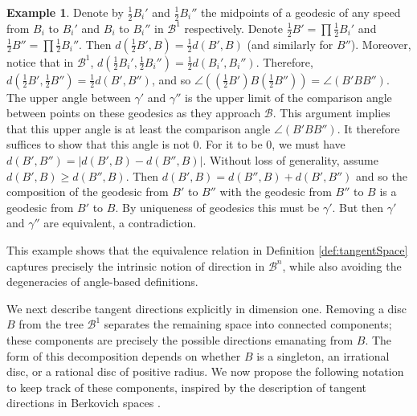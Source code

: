 \documentclass[10pt]{article}
\theoremstyle{definition}
\newtheorem{example}[theorem]{Example}
\begin{document}
\begin{example}
    Denote by $\frac{1}{2}B_i'$ and $\frac{1}{2}B_i''$ the midpoints of a geodesic of any speed from $B_i$ to $B_i'$ and $B_i$ to $B_i''$ in $\mathcal B^1$ respectively. Denote $\frac{1}{2}B' = \prod \frac{1}{2}B_i'$ and $\frac{1}{2}B'' = \prod \frac{1}{2}B_i''$. Then $d(\frac{1}{2}B',B) = \frac{1}{2}d(B',B)$ (and similarly for $B''$). Moreover, notice that in $\mathcal B^1$, $d(\frac{1}{2}B_i',\frac{1}{2}B_i'') = \frac{1}{2}d(B_i',B_i'')$. Therefore, $d(\frac{1}{2}B',\frac{1}{2}B'')=\frac{1}{2}d(B',B'')$, and so $\angle((\frac{1}{2}B')B(\frac{1}{2}B'')) = \angle(B'BB'')$. The upper angle between $\gamma'$ and $\gamma''$ is the upper limit of the comparison angle between points on these geodesics as they approach $\mathcal B$. This argument implies that this upper angle is at least the comparison angle $\angle(B'BB'')$. It therefore suffices to show that this angle is not 0. For it to be 0, we must have $d(B',B'') = |d(B',B)-d(B'',B)|$. Without loss of generality, assume $d(B',B)\geq d(B'',B)$. Then $d(B',B)=d(B'',B)+d(B',B'')$ and so the composition of the geodesic from $B'$ to $B''$ with the geodesic from $B''$ to $B$ is a geodesic from $B'$ to $B$. By uniqueness of geodesics this must be $\gamma'$. But then $\gamma'$ and $\gamma''$ are equivalent, a contradiction.
\end{example}

This example shows that the equivalence relation in Definition \ref{def:tangentSpace} captures precisely the intrinsic notion of direction in $\mathcal{B}^n$, while also avoiding the degeneracies of angle-based definitions.  

We next describe tangent directions explicitly in dimension one. Removing a disc $B$ from the tree $\mathcal B^1$ separates the remaining space into connected components; these components are precisely the possible directions emanating from $B$. The form of this decomposition depends on whether $B$ is a singleton, an irrational disc, or a rational disc of positive radius. We now propose the following notation to keep track of these components, inspired by the description of tangent directions in Berkovich spaces \cite[Section 3]{baker2008introduction}.
\end{document}
